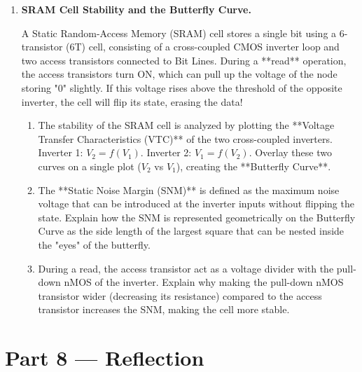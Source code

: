 \documentclass[12pt, a4paper]{book}
\begin{document}
\begin{deepbox}
\begin{enumerate}[label=\textbf{D\arabic*.}]
  \item \textbf{SRAM Cell Stability and the Butterfly Curve.}
  
        A Static Random-Access Memory (SRAM) cell stores a single bit using a 6-transistor (6T) cell, consisting of a cross-coupled CMOS inverter loop and two access transistors connected to Bit Lines.
        During a **read** operation, the access transistors turn ON, which can pull up the voltage of the node storing "0" slightly.
        If this voltage rises above the threshold of the opposite inverter, the cell will flip its state, erasing the data!
        
        \begin{enumerate}[label=(\alph*)]
          \item The stability of the SRAM cell is analyzed by plotting the **Voltage Transfer Characteristics (VTC)** of the two cross-coupled inverters.
                Inverter 1: $V_2 = f(V_1)$.
                Inverter 2: $V_1 = f(V_2)$.
                Overlay these two curves on a single plot ($V_2$ vs $V_1$), creating the **Butterfly Curve**.
          \item The **Static Noise Margin (SNM)** is defined as the maximum noise voltage that can be introduced at the inverter inputs without flipping the state.
                Explain how the SNM is represented geometrically on the Butterfly Curve as the side length of the largest square that can be nested inside the "eyes" of the butterfly.
          \item During a read, the access transistor act as a voltage divider with the pull-down nMOS of the inverter.
                Explain why making the pull-down nMOS transistor wider (decreasing its resistance) compared to the access transistor increases the SNM, making the cell more stable.
        \end{enumerate}
\end{enumerate}
\end{deepbox}

\newpage

\section{Part 8 --- Reflection}
\end{document}
